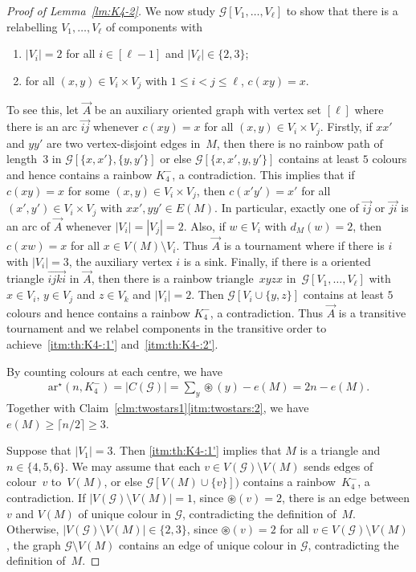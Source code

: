 \documentclass[a4paper, 12pt]{article}
\numberwithin{equation}{section}
\def\sm{{\setminus}}
\def\sar{{\mathrm{ar}^{\star}}}
\def\cen{\circledast}
\newcommand{\ova}[1]{\overrightarrow{#1}}
\newcommand{\ms}[1]{\mathscr{#1}}
\begin{document}
\begin{proof}[Proof of Lemma~\ref{lm:K4-2}]
We now study $\ms{G}[V_1, \dots, V_{\ell}]$ to show that there is a relabelling $V_1, \dots, V_{\ell}$ of components with
\begin{enumerate}[label = {\rm(\alph*$''$)}]
	\item $|V_i| = 2$ for all $i \in [\ell-1]$ and $|V_{\ell}| \in\{2, 3\}$; \label{itm:th:K4-:1'}
	\item for all $(x,y) \in V_i \times V_j$ with $1 \le i < j \le \ell$, $c(xy) = x$. \label{itm:th:K4-:2'}
\end{enumerate}
To see this, let $\ova{A}$ be an auxiliary oriented graph with vertex set $[\ell]$ where there is an arc $\ova{ij}$ whenever $c(xy) = x$ for all $(x,y) \in V_i \times V_j$. 
Firstly, if $xx'$ and $yy'$ are two vertex-disjoint edges in~$M$, then there is no rainbow path of length~$3$ in $\ms{G}[\{x,x'\},\{y,y'\}]$ or else $\ms{G}[\{x,x',y,y'\}]$ contains at least $5$ colours and hence contains a rainbow $K_4^-$, a contradiction.
This implies that if $c(xy) = x$ for some $(x,y) \in V_i \times V_j$, then $c(x'y') = x'$ for all $(x',y') \in V_i \times V_j$ with $xx',yy' \in E(M)$. 
In particular, exactly one of $\ova{ij}$ or $\ova{ji}$ is an arc of $\ova{A}$ whenever $|V_i|=|V_j|=2$.
Also, if $w \in V_i$ with $d_M(w) =2$, then $c(xw) = x$ for all $x \in V(M) \setminus V_i$. 
Thus $\ova{A}$ is a tournament where if there is $i$ with $|V_i|=3$, the auxiliary vertex $i$ is a sink.
Finally, if there is a oriented triangle $\ova{ijki}$ in $\ova{A}$, then there is a rainbow triangle~$xyzx$ in~$\ms{G}[V_1, \dots, V_{\ell}]$ with $x \in V_i$, $y \in V_j$ and $z \in V_k$ and $|V_i| =2$. Then $\ms{G}[V_i \cup \{y,z\}]$ contains at least $5$ colours and hence contains a rainbow $K_4^-$, a contradiction. 
Thus $\ova{A}$ is a transitive tournament and we relabel components in the transitive order to achieve~\ref{itm:th:K4-:1'} and~\ref{itm:th:K4-:2'}.


By counting colours at each centre, we have 
\begin{align}
		\sar(n, K_4^-)  = |C(\ms{G})| = \sum_y \cen(y) - e(M) = 2n-e(M). \label{eqn:uniqueM}
\end{align}
Together with Claim~\ref{clm:twostars1}\ref{itm:twostars:2}, we have $e(M) \ge \lceil n/2 \rceil \ge 3$. 

Suppose that $|V_1| = 3$. 
Then \ref{itm:th:K4-:1'} implies that $M$ is a triangle and $n \in \{4,5,6\}$. 
We may assume that each $v \in V(\ms{G}) \setminus V(M)$ sends edges of colour~$v$ to~$V(M)$, or else $\ms{G}[V(M) \cup \{v\}])$ contains a rainbow~$K_4^-$, a contradiction.
If $|V(\ms{G}) \sm V(M)|=1$, since $\cen(v)=2$, there is an edge between $v$ and $V(M)$ of unique colour in $\ms{G}$, contradicting the definition of~$M$.
Otherwise, $|V(\ms{G}) \setminus V(M)| \in \{2,3\}$, since $\cen(v) = 2$ for all $v \in V(\ms{G}) \setminus V(M)$, the graph $\ms{G} \setminus V(M)$ contains an edge of unique colour in $\ms{G}$, contradicting the definition of~$M$. 


\end{proof}
\end{document}
